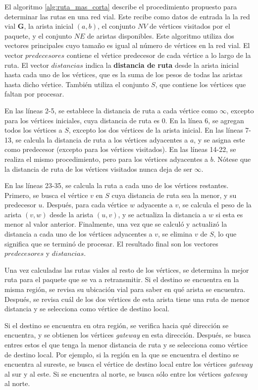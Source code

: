 El algoritmo \ref{alg:ruta_mas_corta} describe el procedimiento propuesto para
determinar las rutas en una red vial. Este recibe como datos de entrada la
la red vial $\mathbf{G}$, la arista inicial $(a,b)$, el conjunto $NV$ de
vértices visitados por el paquete, y el conjunto $NE$ de aristas disponibles.
Este algoritmo utiliza dos vectores principales cuyo tamaño es igual al número
de vértices en la red vial. El vector $predecesores$ contiene el vértice
predecesor de cada vértice a lo largo de la ruta. El vector $distancias$ indica
la \textbf{distancia de ruta} desde la arista inicial hasta cada uno de los
vértices, que es la suma de los pesos de todas las aristas hasta dicho
vértice. También utiliza el conjunto $S$, que contiene los vértices que faltan
por procesar.

En las líneas 2-5, se establece la distancia de ruta a cada vértice como
$\infty$, excepto para los vértices iniciales, cuya distancia de ruta es 0. En
la línea 6, se agregan todos los vértices a $S$, excepto los dos vértices de la
arista inicial. En las líneas 7-13, se calcula la distancia de ruta a los
vértices adyacentes a $a$, y se asigna este como predecesor (excepto para los
vértices visitados). En las líneas 14-22, se realiza el mismo procedimiento,
pero para los vértices adyacentes a $b$. Nótese que la distancia de ruta de los
vértices visitados nunca deja de ser $\infty$.

En las líneas 23-35, se calcula la ruta a cada uno de los vértices restantes.
Primero, se busca el vértice $v$ en $S$ cuya distancia de ruta sea la menor, y
su predecesor $u$. Después, para cada vértice $w$ adyacente a $v$, se calcula el
peso de la arista $(v,w)$ desde la arista $(u,v)$, y se actualiza la distancia a
$w$ si esta es menor al valor anterior. Finalmente, una vez que se calculó y
actualizó la distancia a cada uno de los vértices adyacentes a $v$, se elimina
$v$ de $S$, lo que significa que se terminó de procesar. El resultado final son
los vectores $predecesores$ y $distancias$.

Una vez calculadas las rutas viales al resto de los vértices, se determina la
mejor ruta para el paquete que se va a retransmitir. Si el destino se encuentra
en la misma región, se revisa su ubicación vial para saber en qué arista se
encuentra. Después, se revisa cuál de los dos vértices de esta arista tiene una
ruta de menor distancia y se selecciona como vértice de destino local.

Si el destino se encuentra en otra región, se verifica hacia qué dirección se
encuentra, y se obtienen los vértices \textit{gateway} en esta dirección.
Después, se busca entres estos el que tenga la menor distancia de ruta y se
selecciona como vértice de destino local. Por ejemplo, si la región en la que se
encuentra el destino se encuentra al sureste, se busca el vértice de destino
local entre los vértices \textit{gateway} al sur y al este. Si se encuentra al
norte, se busca sólo entre los vértices \textit{gateway} al norte.

